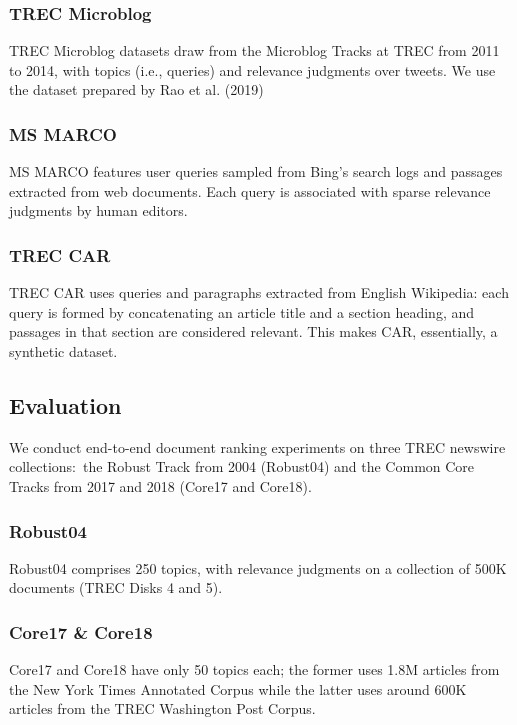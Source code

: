 \subsubsection{TREC Microblog}

TREC Microblog datasets draw from the Microblog Tracks at TREC from 2011 to 2014, with topics (i.e., queries) and relevance judgments over tweets. We use the dataset prepared by Rao et al. (2019)

\subsubsection{MS MARCO}

MS MARCO features user queries sampled from Bing’s search logs and passages extracted from web documents. Each query is associated with sparse relevance judgments by human editors.

\subsubsection{TREC CAR}

TREC CAR uses queries and paragraphs extracted from English Wikipedia: each query is formed by concatenating an article title and a section heading, and passages in that section are considered relevant.
This makes CAR, essentially, a synthetic dataset.

\subsection{Evaluation}

We conduct end-to-end document ranking experiments on three TREC newswire collections:\
the Robust Track from 2004 (Robust04) and the Common Core Tracks from 2017 and 2018 (Core17 and Core18).

\subsubsection{Robust04}

Robust04 comprises 250 topics, with relevance judgments on a collection of 500K documents (TREC Disks 4 and 5).

\subsubsection{Core17 \& Core18}
 
Core17 and Core18 have only 50 topics each; the former uses 1.8M articles from the New York Times Annotated Corpus while the latter uses around 600K articles from the TREC Washington Post Corpus.
